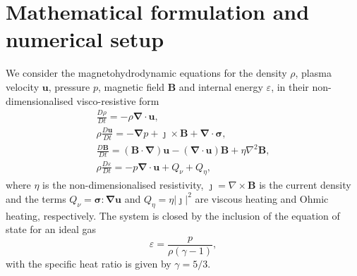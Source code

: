 \documentclass[fleqn,usenatbib]{mnras}
\newcommand{\ten}[1]{{\bm #1}}
\renewcommand{\vec}[1]{{\bm #1}}
\begin{document}
\section{Mathematical formulation and numerical setup}
\label{sec-numerical-setup}

We consider the magnetohydrodynamic equations for the density $\rho$, plasma
velocity $\vec{u}$, pressure $p$, magnetic field $\vec{B}$ and internal energy
$\varepsilon$, in their non-dimensionalised visco-resistive form
\begin{subequations}
  \label{eq:MHD}
  \begin{gather}
\label{eq:mhda}
\frac{D\rho}{Dt} = - \rho \vec{\nabla} \cdot \vec{u},\\
\rho\frac{D\vec{u}}{Dt} = -\vec{\nabla} p + \vec{\jmath} \times \vec{B} + \vec{\nabla} \cdot \ten{\sigma},\\
\frac{D\vec{B}}{Dt} = (\vec{B} \cdot \vec{\nabla})\vec{u} - (\vec{\nabla} \cdot \vec{u})\vec{B} + \eta \nabla^2 \vec{B},\\
\rho\frac{D\varepsilon}{Dt} = -p \vec{\nabla} \cdot \vec{u} + {Q}_{\nu} + {Q}_{\eta},%
    \end{gather}
\end{subequations}
where $\eta$ is the non-dimensionalised resistivity, $\vec{\jmath} = \nabla
\times \vec{B}$ is the current density and the terms ${Q}_{\nu} = \ten{\sigma}
: \vec{\nabla}\vec{u}$ and ${Q}_{\eta} = \eta | \vec{\jmath} |^2$ are viscous
heating and Ohmic heating, respectively. The system is closed by the inclusion
of the equation of state for an ideal gas 
\begin{equation}
\varepsilon = \frac{p}{\rho(\gamma - 1)},
\end{equation}
with the specific heat ratio is given by $\gamma = 5/3$.
\end{document}
